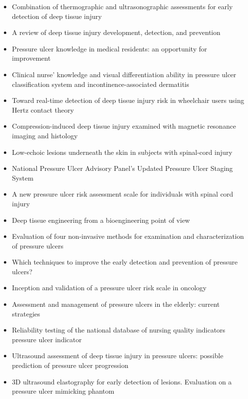 			\begin{itemize}
				\item Combination of thermographic and ultrasonographic assessments for early detection of deep tissue injury \cite{higashino12}
				\item A review of deep tissue injury development, detection, and prevention \cite{gefen13}
				\item Pressure ulcer knowledge in medical residents: an opportunity for improvement \cite{levine12}
				\item Clinical nurse' knowledge and visual differentiation ability in pressure ulcer classification system and incontinence-associated dermatitis \cite{lee13}
				\item Toward real-time detection of deep tissue injury risk in wheelchair users using Hertz contact theory \cite{agam08}
				\item Compression-induced deep tissue injury examined with magnetic resonance imaging and histology \cite{stekelenburg06}
				\item Low-echoic lesions underneath the skin in subjects with spinal-cord injury \cite{kanno09}
				\item National Pressure Ulcer Advisory Panel's Updated Pressure Ulcer Staging System \cite{black07}
				\item A new pressure ulcer risk assessment scale for individuals with spinal cord injury \cite{salzberg96}
				\item Deep tissue engineering from a bioengineering point of view \cite{gefen09}
				\item Evaluation of four non-invasive methods for examination and characterization of pressure ulcers \cite{andersen08}
				\item Which techniques to improve the early detection and prevention of pressure ulcers? \cite{gehin06}
				\item Inception and validation of a pressure ulcer risk scale in oncology \cite{fromantin11}
				\item Assessment and management of pressure ulcers in the elderly: current strategies \cite{jaul10}
				\item Reliability testing of the national database of nursing quality indicators pressure ulcer indicator \cite{hart10}
				\item Ultrasound assessment of deep tissue injury in pressure ulcers: possible prediction of pressure ulcer progression \cite{aoi08}
				\item 3D ultrasound elastography for early detection of lesions. Evaluation on a pressure ulcer mimicking phantom \cite{deprez07}
			\end{itemize}

